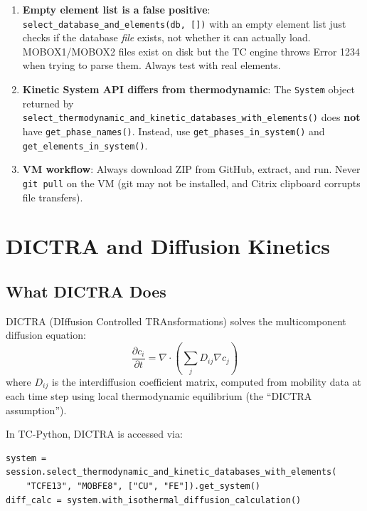 \documentclass[11pt]{article}
\begin{document}
\begin{enumerate}[leftmargin=*]
    \item \textbf{Empty element list is a false positive}: \texttt{select\_database\_and\_elements(db, [])} with an empty element list just checks if the database \textit{file} exists, not whether it can actually load. MOBOX1/MOBOX2 files exist on disk but the TC engine throws Error 1234 when trying to parse them. Always test with real elements.

    \item \textbf{Kinetic System API differs from thermodynamic}: The \texttt{System} object returned by \texttt{select\_thermodynamic\_and\_kinetic\_databases\_with\_elements()} does \textbf{not} have \texttt{get\_phase\_names()}. Instead, use \texttt{get\_phases\_in\_system()} and \texttt{get\_elements\_in\_system()}.

    \item \textbf{VM workflow}: Always download ZIP from GitHub, extract, and run. Never \texttt{git pull} on the VM (git may not be installed, and Citrix clipboard corrupts file transfers).
\end{enumerate}


\section{DICTRA and Diffusion Kinetics}
\label{sec:dictra}

\subsection{What DICTRA Does}

DICTRA (DIffusion Controlled TRAnsformations) solves the multicomponent diffusion equation:
\begin{equation}
    \frac{\partial c_i}{\partial t} = \nabla \cdot \left( \sum_j D_{ij} \nabla c_j \right)
    \label{eq:diffusion}
\end{equation}
where $D_{ij}$ is the interdiffusion coefficient matrix, computed from mobility data at each time step using local thermodynamic equilibrium (the ``DICTRA assumption'').

In TC-Python, DICTRA is accessed via:
\begin{lstlisting}
system = session.select_thermodynamic_and_kinetic_databases_with_elements(
    "TCFE13", "MOBFE8", ["CU", "FE"]).get_system()
diff_calc = system.with_isothermal_diffusion_calculation()
\end{lstlisting}
\end{document}
